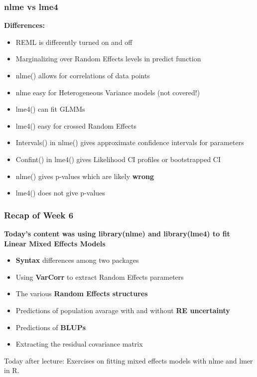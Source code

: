 \documentclass{beamer}
\begin{document}
\begin{frame}[fragile]
    \frametitle{nlme vs lme4}
    \textbf{Differences:}
    \begin{itemize}
        \item REML is differently turned on and off
        \item Marginalizing over Random Effects levels in predict function
        \item nlme() allows for correlations of data points
        \item nlme easy for Heterogeneous Variance models (not covered!)
        \item lme4() can fit GLMMs
        \item lme4() easy for crossed Random Effects
        \item Intervals() in nlme() gives approximate confidence intervals for parameters
        \item Confint() in lme4() gives Likelihood CI profiles or bootstrapped CI
        \item nlme() gives p-values which are likely \textbf{wrong}
        \item lme4() does not give p-values
    \end{itemize}
\end{frame}

\begin{frame}
    \frametitle{Recap of Week 6}
    \textbf{Today's content was using library(nlme) and library(lme4) to fit Linear Mixed Effects Models}
    \vspace{0.5cm}
    
    \begin{itemize}
        \item \textbf{Syntax} differences among two packages
        \item Using \textbf{VarCorr} to extract Random Effects parameters
        \item The various \textbf{Random Effects structures}
        \item Predictions of population avarage with and without \textbf{RE uncertainty}
        \item Predictions of \textbf{BLUPs}
        \item Extracting the residual covariance matrix
    \end{itemize}
    \vspace{0.5cm}
    
    Today after lecture: Exercises on fitting mixed effects models with nlme and lmer in R.
\end{frame}
\end{document}
